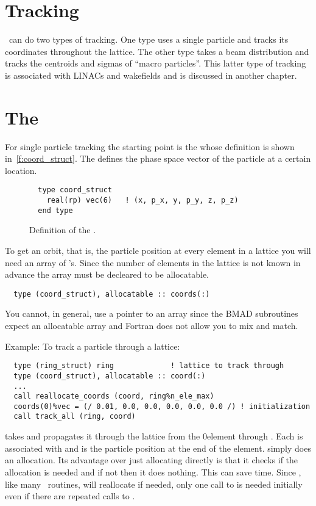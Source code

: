 \chapter{Tracking}

\bmad\ can do two types of tracking. One type uses a single particle 
and tracks its coordinates throughout the lattice. The other type
takes a beam distribution and tracks the centroids and sigmas of
``macro particles''.  This latter type of tracking is associated with
LINACs and wakefields and is discussed in another chapter.

\chapter{The }

For single particle tracking the starting point is the
 whose definition is shown
in~\ref{f:coord_struct}. The  defines the phase
space vector of the particle at a certain location.

\begin{figure}[tb]
\centering
\small
\begin{verbatim}
  type coord_struct
    real(rp) vec(6)   ! (x, p_x, y, p_y, z, p_z)
  end type
\end{verbatim}
\caption{Definition of the .}
\label{f:ele_struct}
\end{figure}

To get an orbit, that is, the particle position at every element in a lattice
you will need an array of 's. Since
the number of elements in the lattice is not known in advance the
array must be decleared to be allocatable. 
\begin{verbatim}
  type (coord_struct), allocatable :: coords(:)
\end{verbatim}
You cannot, in general, use a pointer to an array since the BMAD
subroutines expect an allocatable array and Fortran does not allow you
to mix and match.

Example: To track a particle through a lattice:
\begin{verbatim}
  type (ring_struct) ring             ! lattice to track through
  type (coord_struct), allocatable :: coord(:)
  ...
  call reallocate_coords (coord, ring%n_ele_max)
  coords(0)%vec = (/ 0.01, 0.0, 0.0, 0.0, 0.0, 0.0 /) ! initialization
  call track_all (ring, coord)
\end{verbatim}
 takes  and propagates it through the lattice from
the 0\Th element through .  Each 
is associated with  and is the particle position at
the end of the element.  simply does an
allocation. Its advantage over just allocating directly is that it
checks if the allocation is needed and if not then it does
nothing. This can save time. Since , like many \bmad\
routines, will reallocate if needed, only one call to
 is needed initially even if there are repeated calls
to \sn{track\_all}.

